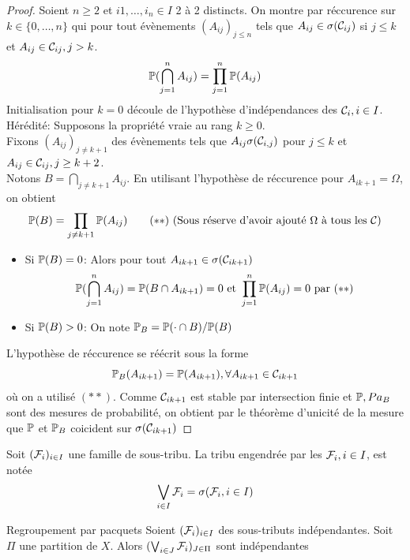 \documentclass[]{report}
\begin{document}
    \begin{proof}
        Soient $n\ge 2$ et $i1,\ldots,i_n\in I$ 2 à 2 distincts. On montre par réccurence sur $k\in\{0,\ldots,n\}$ qui pour tout évènements $(A_{ij})_{j\le n}$ tels que $A_{ij}\in \sigma(\mathcal{C}_{ij})$ si $j\le k$ et $A_{ij}\in \mathcal{C}_{ij},j>k$.
        \[\mathbb{P}(\bigcap_{j=1}^n A_{ij})=\prod_{j=1}^{n}\mathbb{P}(A_{ij})\]
        Initialisation pour $k=0$ découle de l'hypothèse d'indépendances des $\mathcal{C}_i,i\in I$.\\
        Hérédité: Supposons la propriété vraie au rang $k\ge 0$.\\
        Fixons $(A_{ij})_{j\neq k+1}$ des évènements tels que $A_{ij}\sigma(\mathcal{C}_{i,j})$ pour $j\le k$ et $A_{ij}\in \mathcal{C}_{ij},j\ge k+2$.\\
        Notons $B=\bigcap_{j\neq k+1}A_{ij}$. En utilisant l'hypothèse de réccurence pour $A_{ik+1}=\Omega$, on obtient
        \[\mathbb{P}(B)=\prod_{j\neq k+1} \mathbb{P}(A_{ij})\qquad (**)\text{ (Sous réserve d'avoir ajouté $\Omega$ à tous les $\mathcal{C}$)}\]
        \begin{itemize}
            \item Si $\mathbb{P}(B)=0$: Alors pour tout $A_{ik+1}\in \sigma(\mathcal{C}_{ik+1})$
            \[\mathbb{P}(\bigcap_{j=1}^n A_{ij})=\mathbb{P}(B\cap A_{ik+1})=0\text{ et }\prod_{j=1}^{n}\mathbb{P}(A_{ij})=0\text{ par }(**)\]
            \item Si $\mathbb{P}(B)>0$: On note $\mathbb{P}_B=\mathbb{P}(\cdot \cap B)/\mathbb{P}(B)$
        \end{itemize}
        L'hypothèse de réccurence se réécrit sous la forme
        \[\mathbb{P}_B(A_{ik+1})=\mathbb{P}(A_{ik+1}),\forall A_{ik+1}\in\mathcal{C}_{ik+1}\]
        où on a utilisé $(**)$. Comme $\mathcal{C}_{ik+1}$ est stable par intersection finie et $\mathbb{P},Pa_B$ sont des mesures de probabilité, on obtient par le théorème d'unicité de la mesure que $\mathbb{P}$ et $\mathbb{P}_B$ coicident sur $\sigma(\mathcal{C}_{ik+1})$
    \end{proof}

    \begin{nt}{}{}
        Soit $(\mathcal{F}_i)_{i\in I}$ une famille de sous-tribu. La tribu engendrée par les $\mathcal{F}_i,i\in I$, est notée
        \[\bigvee_{i\in I}\mathcal{F}_i=\sigma(\mathcal{F}_i,i\in I)\]
    \end{nt}

    \begin{prop}{Regroupement par pacquets}{}
        Soient $(\mathcal{F}_i)_{i\in I}$ des sous-tributs indépendantes. Soit $\Pi$ une partition de $X$. Alors $(\bigvee_{i\in J}\mathcal{F}_i)_{J\in \Pi}$ sont indépendantes
    \end{prop}
\end{document}
